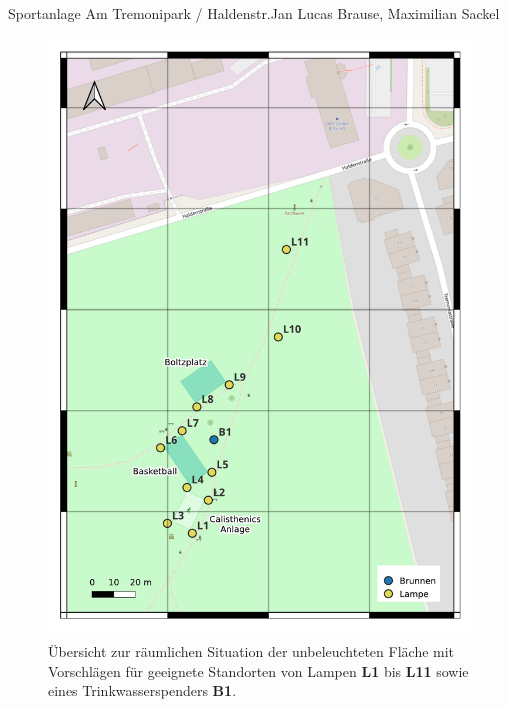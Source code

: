 \documentclass{../../templates/amendment}
\begin{document}
\begin{boxed}{Sportanlage Am Tremonipark / Haldenstr.}{Jan Lucas Brause, Maximilian Sackel}
    \begin{figure}[htpb]
        \centering
        \includegraphics[width=0.8\linewidth]{pictures/map3.pdf}
        \caption{Übersicht zur räumlichen Situation der unbeleuchteten Fläche
            mit Vorschlägen für geeignete Standorten von Lampen \textbf{L1} bis
        \textbf{L11} sowie eines Trinkwasserspenders \textbf{B1}.}%
        \label{fig:}
    \end{figure}
\end{boxed}
\end{document}
